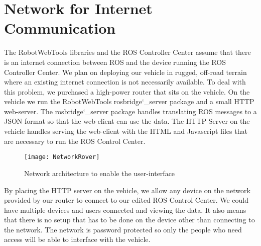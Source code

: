 \section{Network for Internet Communication}The RobotWebTools libraries and the ROS Controller Center assume that there is an internet connection between ROS and the device running the ROS Controller Center.  We plan on deploying our vehicle in rugged, off-road terrain where an existing internet connection is not necessarily available.  To deal with this problem, we purchased a high-power router that sits on the vehicle.  On the vehicle we run the RobotWebTools rosbridge\char`_server package and a small HTTP web-server.  The rosbridge\char`_server package handles translating ROS messages to a JSON format so that the web-client can use the data.  The HTTP Server on the vehicle handles serving the web-client with the HTML and Javascript files that are necessary to run the ROS Control Center.

\begin{figure}[H]
\centerline{\texttt{[image: NetworkRover]}}
\caption[]{Network architecture to enable the user-interface}
\label{fig:NetworkRover}
\end{figure}

By placing the HTTP server on the vehicle, we allow any device on the network provided by our router to connect to our edited ROS Control Center.  We could have multiple devices and users connected and viewing the data.  It also means that there is no setup that has to be done on the device other than connecting to the network.  The network is password protected so only the people who need access will be able to interface with the vehicle.  